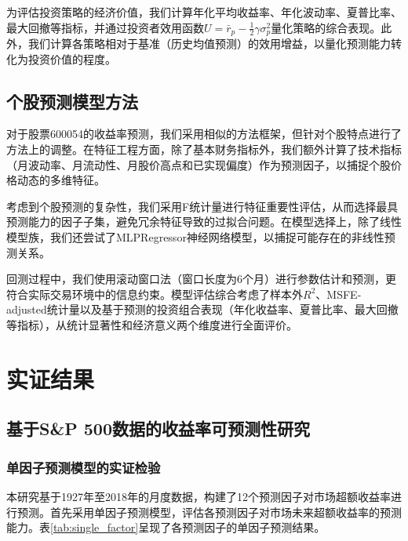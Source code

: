 \documentclass[12pt, a4paper]{article}
\begin{document}
为评估投资策略的经济价值，我们计算年化平均收益率、年化波动率、夏普比率、最大回撤等指标，并通过投资者效用函数$U = \bar{r}_p - \frac{1}{2}\gamma\sigma_p^2$量化策略的综合表现。此外，我们计算各策略相对于基准（历史均值预测）的效用增益，以量化预测能力转化为投资价值的程度。

\subsection{个股预测模型方法}

对于股票600054的收益率预测，我们采用相似的方法框架，但针对个股特点进行了方法上的调整。在特征工程方面，除了基本财务指标外，我们额外计算了技术指标（月波动率、月流动性、月股价高点和已实现偏度）作为预测因子，以捕捉个股价格动态的多维特征。

考虑到个股预测的复杂性，我们采用F统计量进行特征重要性评估，从而选择最具预测能力的因子子集，避免冗余特征导致的过拟合问题。在模型选择上，除了线性模型族，我们还尝试了MLPRegressor神经网络模型，以捕捉可能存在的非线性预测关系。

回测过程中，我们使用滚动窗口法（窗口长度为6个月）进行参数估计和预测，更符合实际交易环境中的信息约束。模型评估综合考虑了样本外$R^2$、MSFE-adjusted统计量以及基于预测的投资组合表现（年化收益率、夏普比率、最大回撤等指标），从统计显著性和经济意义两个维度进行全面评价。

\section{实证结果}

\subsection{基于S\&P 500数据的收益率可预测性研究}

\subsubsection{单因子预测模型的实证检验}

本研究基于1927年至2018年的月度数据，构建了12个预测因子对市场超额收益率进行预测。首先采用单因子预测模型，评估各预测因子对市场未来超额收益率的预测能力。表\ref{tab:single_factor}呈现了各预测因子的单因子预测结果。
\end{document}
